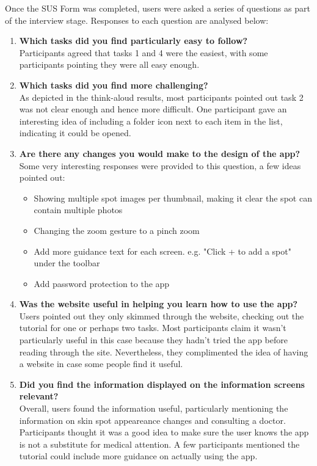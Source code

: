 Once the SUS Form was completed, users were asked a series of questions as part of the interview stage. Responses to each question are analysed below:
\begin{enumerate}
    \item \textbf{Which tasks did you find particularly easy to follow?}
    \\Participants agreed that tasks 1 and 4 were the easiest, with some participants pointing they were all easy enough.
    \item \textbf{Which tasks did you find more challenging?}
    \\As depicted in the think-aloud results, most participants pointed out task 2 was not clear enough and hence more difficult. One participant gave an interesting idea of including a folder icon next to each item in the list, indicating it could be opened.
    \item \textbf{Are there any changes you would make to the design of the app?}
    \\Some very interesting responses were provided to this question, a few ideas pointed out:
    \begin{itemize}
        \item Showing multiple spot images per thumbnail, making it clear the spot can contain multiple photos
        \item Changing the zoom gesture to a pinch zoom
        \item Add more guidance text for each screen. e.g. "Click + to add a spot" under the toolbar
        \item Add password protection to the app
    \end{itemize}
    \item \textbf{Was the website useful in helping you learn how to use the app?}
    \\ Users pointed out they only skimmed through the website, checking out the tutorial for one or perhaps two tasks. Most participants claim it wasn't particularly useful in this case because they hadn't tried the app before reading through the site. Nevertheless, they complimented the idea of having a website in case some people find it useful.
    \item \textbf{Did you find the information displayed on the information screens relevant?}
    \\ Overall, users found the information useful, particularly mentioning the information on skin spot appeareance changes and consulting a doctor. Participants thought it was a good idea to make sure the user knows the app is not a substitute for medical attention. A few participants mentioned the tutorial could include more guidance on actually using the app.
\end{enumerate}